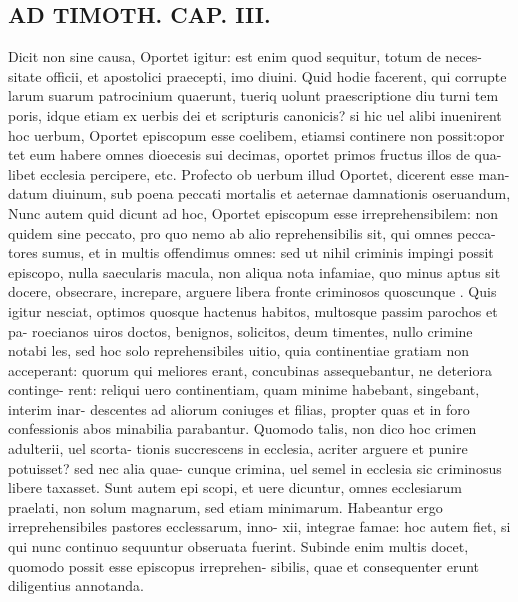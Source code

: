 \documentclass{article}
\begin{document}
\begin{pages}
\section*{AD TIMOTH. CAP. III. }
\marginpar{[ p.491 ]}\pstart Dicit non sine causa, Oportet igitur: est enim quod sequitur, totum de neces- sitate officii, et apostolici praecepti, imo diuini. Quid hodie facerent, qui corrupte larum suarum patrocinium quaerunt, tueriq uolunt praescriptione diu turni tem poris, idque etiam ex uerbis dei et scripturis canonicis? si hic uel alibi inuenirent hoc uerbum, Oportet episcopum esse coelibem, etiamsi continere non possit:opor tet eum habere omnes dioecesis sui decimas, oportet primos fructus illos de qua- libet ecclesia percipere, etc. Profecto ob uerbum illud Oportet, dicerent esse man- datum diuinum, sub poena peccati mortalis et aeternae damnationis oseruandum, Nunc autem quid dicunt ad hoc, Oportet episcopum esse irreprehensibilem: non quidem sine peccato, pro quo nemo ab alio reprehensibilis sit, qui omnes pecca- tores sumus, et in multis offendimus omnes: sed ut nihil criminis impingi possit episcopo, nulla saecularis macula, non aliqua nota infamiae, quo minus aptus sit docere, obsecrare, increpare, arguere libera fronte criminosos quoscunque . Quis igitur nesciat, optimos quosque hactenus habitos, multosque passim parochos et pa- roecianos uiros doctos, benignos, solicitos, deum timentes, nullo crimine notabi les, sed hoc solo reprehensibiles uitio, quia continentiae gratiam non acceperant: quorum qui meliores erant, concubinas assequebantur, ne deteriora continge- rent: reliqui uero continentiam, quam minime habebant, singebant, interim inar- descentes ad aliorum coniuges et filias, propter quas et in foro confessionis abos minabilia parabantur. Quomodo talis, non dico hoc crimen adulterii, uel scorta- tionis succrescens in ecclesia, acriter arguere et punire potuisset? sed nec alia quae- cunque crimina, uel semel in ecclesia sic criminosus libere taxasset. Sunt autem epi scopi, et uere dicuntur, omnes ecclesiarum praelati, non solum magnarum, sed etiam minimarum. Habeantur ergo irreprehensibiles pastores ecclessarum, inno- xii, integrae famae: hoc autem fiet, si qui nunc continuo sequuntur obseruata fuerint. Subinde enim multis docet, quomodo possit esse episcopus irreprehen- sibilis, quae et consequenter erunt diligentius annotanda.  \pend
{}
{}

\end{pages}
\end{document}

